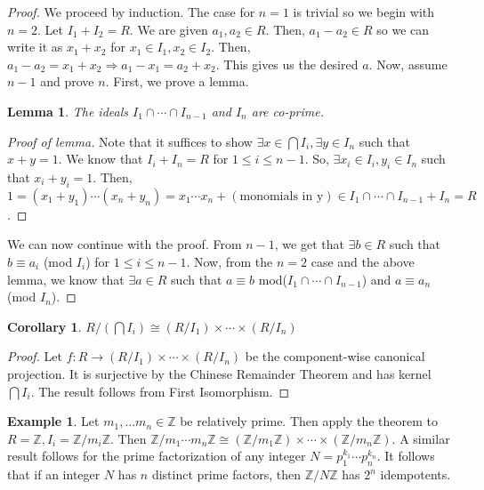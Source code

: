 \documentclass{article}
\newcommand\Z{\ensuremath{\mathbb{Z}}}
\newtheorem{corollary}{Corollary}[theorem]
\newtheorem{lemma}[theorem]{Lemma}
\theoremstyle{definition}
\newtheorem{eg}{Example}[subsection]
\theoremstyle{remark}
\theoremstyle{plain}
\begin{document}
    \begin{proof}
        We proceed by induction. The case for \(n=1\) is trivial so we begin with \(n = 2\). Let \(I_1 + I_2 = R\). We are given \(a_1, a_2 \in R\). Then, \(a_1 - a_2 \in R\) so we can write it as \(x_1 + x_2\) for \(x_1 \in I_1, x_2 \in I_2\). Then, \(a_1 - a_2 = x_1 + x_2 \Rightarrow a_1 - x_1 = a_2 + x_2\). This gives us the desired \(a\). 
        Now, assume \(n-1\) and prove \(n\). First, we prove a lemma. 
        \begin{lemma}
            The ideals \(I_1 \cap \cdots \cap I_{n-1}\) and \(I_n\) are co-prime. 
        \end{lemma}
        \begin{proof}[Proof of lemma]
            Note that it suffices to show \(\exists x\in \bigcap I_i, \exists y \in I_n\) such that \(x+y = 1\).
            We know that \(I_i + I_n = R\) for \(1 \leq i \leq n-1\). So, \(\exists x_i \in I_i, y_i \in I_n\) such that \(x_i + y_i = 1\). Then, \(1=(x_1+y_1)\cdots(x_n+y_n) = x_1\cdots x_n + (\text{monomials in y}) \in I_1 \cap \cdots \cap I_{n-1} + I_n = R\). 
        \end{proof}
        We can now continue with the proof. 
        From \(n-1\), we get that \(\exists b\in R\) such that \(b \equiv a_i\) (mod \(I_i\)) for \(1\leq i\leq n-1\). 
        Now, from the \(n = 2\) case and the above lemma, we know that \(\exists a\in R\) such that \(a\equiv b\) mod(\(I_1\cap\cdots\cap I_{n-1}\)) and \(a \equiv a_n\) (mod $I_n$).
    \end{proof}

    \begin{corollary}
        \(R/(\bigcap I_i) \cong (R/I_1)\times \cdots \times (R/I_n)\)
    \end{corollary}
    \begin{proof}
        Let \(f: R \to (R/I_1)\times \cdots \times (R/I_n)\) be the component-wise canonical projection. It is surjective by the Chinese Remainder Theorem and has kernel \(\bigcap I_i\). The result follows from First Isomorphism.
    \end{proof}

    \begin{eg}
        Let \(m_1, \ldots m_n \in \Z\) be relatively prime. Then apply the theorem to \(R= \Z, I_i = \Z/m_i\Z\). Then \(\Z/m_1\cdots m_n\Z \cong (\Z/m_1\Z)\times \cdots \times (\Z/m_n \Z)\). A similar result follows for the prime factorization of any integer \(N = p_1^{k_1}\cdots p_n^{k_n}\). It follows that if an integer \(N\) has \(n\) distinct prime factors, then \(\Z/N\Z\) has \(2^n\) idempotents.
    \end{eg}
\end{document}
